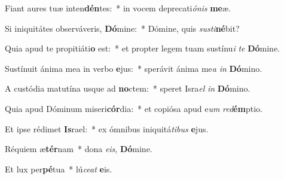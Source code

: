 \item Fiant aures tuæ inten\textbf{dén}tes:~* in vocem deprecati\hspace*{0.01em}\textit{ónis} \textbf{me}æ.
\item Si iniquitátes observáveris, \textbf{Dó}mine:~* Dómine, quis \textit{susti}\hspace{-0.01em}\textbf{né}bit?
\item Quia apud te propitiáti\textbf{o} est:~* et pro\-pter legem tuam sustínu\hspace*{0.03em}\textit{i} \textit{te} \textbf{Dó}mine.
\item Sustínuit ánima mea in verbo \textbf{e}jus:~* sperávit ánima me\hspace*{0.03em}\textit{a} \textit{in} \textbf{Dó}mino.
\item A custódia matutína usque ad \textbf{no}ctem:~* speret Isra\hspace*{0.03em}\textit{el} \textit{in} \textbf{Dó}mino.
\item Quia apud Dóminum miseri\textbf{cór}dia:~* et copiósa apud e\hspace*{0.03em}\textit{um} \textit{red}\textbf{ém}ptio.
\item Et ipse rédimet \textbf{Is}rael:~* ex ómnibus iniquitá\hspace*{0.03em}\textit{tibus} \textbf{e}jus.
\item Réquiem æ\textbf{tér}nam~* dona \textit{e}\textit{is}, \textbf{Dó}mine.
\item Et lux per\textbf{pé}tua~* lú\hspace*{0.03em}\textit{ce}\textit{at} \textbf{e}is.